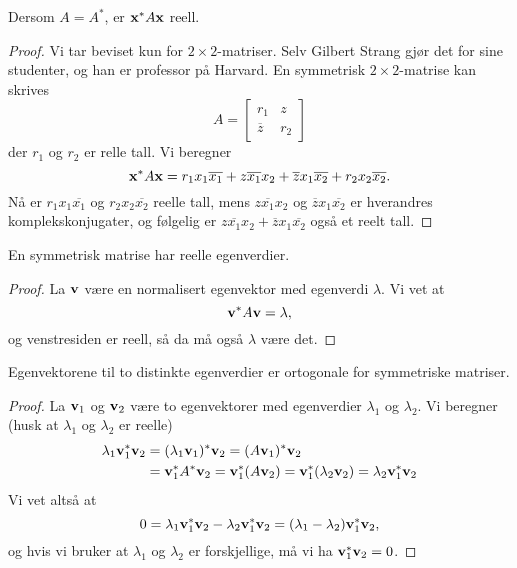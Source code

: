 \begin{thm}
Dersom  $A=A^*$, er 
$
\mathbf{x}^* A \mathbf{x}
$
reell.
\end{thm}
\begin{proof}
Vi tar beviset kun for $2 \times 2$-matriser. Selv Gilbert Strang gjør det for sine studenter, og han er professor på Harvard.
En symmetrisk $2 \times 2$-matrise kan skrives
\[
A=\begin{bmatrix}
r_1 & z\\
\overline{z} & r_2
\end{bmatrix}
\]
der $r_1$ og $r_2$ er relle tall. Vi beregner
\[
\mathbf{x}^* A \mathbf{x}=r_1x_1\overline{x_1}+z\overline{ x_1}x_2+\overline{z}x_1\overline{ x_2}+r_2x_2\overline{x_2}.
\]
Nå er $r_1x_1\overline{x_1}$ og $r_2x_2\overline{x_2}$ reelle tall, 
mens $z \overline{x_1}x_2$ og 
$\overline{z}x_1\overline{x_2}$ er hverandres komplekskonjugater, 
og følgelig er 
$z\overline{x_1}x_2+\overline{z}x_1\overline{x_2}$ også et reelt tall.
\end{proof}


\begin{thm}
En  symmetrisk matrise har reelle egenverdier.
\end{thm}
\begin{proof}
La $\mathbf{v}$ være en normalisert egenvektor med egenverdi $\lambda$. Vi vet at 
\[
\mathbf{v}^* A \mathbf{v}=\lambda,
\]
og venstresiden er reell, så da må også $\lambda$ være det.
\end{proof}



\begin{thm}
Egenvektorene til to distinkte egenverdier er ortogonale for symmetriske matriser.
\end{thm}

\begin{proof}
La $\mathbf{v}_1$ og $\mathbf{v}_2$ være to egenvektorer med egenverdier $\lambda_1$ og $\lambda_2$. 
Vi beregner (husk at $\lambda_1$ og $\lambda_2$ er reelle)
\begin{align*}
\lambda_1 \mathbf{v}_1^*\mathbf{v}_2&=(\lambda_1 \mathbf{v}_1)^*\mathbf{v}_2=(A \mathbf{v}_1)^*\mathbf{v}_2\\&= \mathbf{v}_1^*A^*\mathbf{v}_2=\mathbf{v}_1^*(A\mathbf{v}_2)=\mathbf{v}_1^*(\lambda_2\mathbf{v}_2)=\lambda_2 \mathbf{v}_1^*\mathbf{v}_2
\end{align*}
Vi vet altså at
\[
0= \lambda_1 \mathbf{v}_1^*\mathbf{v}_2-\lambda_2 \mathbf{v}_1^*\mathbf{v}_2=(\lambda_1-\lambda_2) \mathbf{v}_1^*\mathbf{v}_2,
\]
og hvis vi bruker at $\lambda_1$ og $\lambda_2$ er forskjellige, må vi ha $\mathbf{v}_1^*\mathbf{v}_2=0$.
\end{proof}

